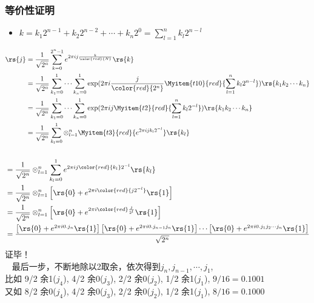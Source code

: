 \begin{frame}
    \frametitle{等价性证明}
    \begin{itemize}
        \item $k=k_1 2^{n-1}+k_2 2^{n-2}+\cdots+ k_n 2^{0} = \sum_{l=1} ^ n k_l 2^{n-l} $
      \end{itemize} 
    \[\begin{aligned} 
    \rs{j}&= \frac{1}{\sqrt{2^n}}\sum_{k=0} ^{2^n -1} e^{2\pi i j\frac{k}{\color{red}{N}}} \rs{k} \\
    &= \frac{1}{\sqrt{2^n}} \sum_{k_{1}=0} ^{1} \cdots \sum_{k_{n}=0} ^{1} \exp(2\pi i \frac{j}{\color{red}{2^n}}\Myitem{t10}{red}{\sum_{l=1} ^ n k_l 2^{n-l} }) \rs{k_1 k_2 \cdots k_n} \\
    &= \frac{1}{\sqrt{2^n}} \sum_{k_{1}=0} ^{1} \cdots \sum_{k_{n}=0} ^{1} \exp(2\pi i j \Myitem{t2}{red}{\sum_{l=1} ^ n k_l 2^{-l} }) \rs{k_1 k_2 \cdots k_n} \\
    &= \frac{1}{\sqrt{2^n}} \sum_{k_{l}=0} ^{1} \otimes_{l=1} ^n \Myitem{t3}{red}{e^{2\pi i j k_l 2^{-l} }} \rs{k_l} 
    \end{aligned}\]
\end{frame}

\begin{frame}
    \frametitle{}
    \[\begin{aligned} 
    &= \frac{1}{\sqrt{2^n}} \otimes_{l=1} ^n \sum_{k_{l}=0} ^{1} {e^{2\pi i j {\color{red}{k_l}} 2^{-l} }} \rs{k_l} \\
    &= \frac{1}{\sqrt{2^n}} \otimes_{l=1} ^n \left[\rs{0} + e^{2\pi i \color{red}{j 2^{-l}} } \rs{1}\right] \\
    &= \frac{1}{\sqrt{2^n}} \otimes_{l=1} ^n \left[\rs{0} + e^{2\pi i {\color{red}\frac{j}{2^{l}}}} \rs{1}\right] \\
    &= \frac{\left[\rs{0} + e^{2\pi i 0. j_n} \rs{1} \right] \left[\rs{0} + e^{2\pi i 0. j_{n-1} j_n} \rs{1} \right] \cdots \left[\rs{0} + e^{2\pi i 0. j_1 j_2 \cdots j_n} \rs{1} \right] } {\sqrt{2^n}}\\
    \end{aligned}\]
    证毕！\\

    \Tips~ 最后一步，不断地除以2取余，依次得到$j_n, j_{n-1}, \cdots, j_1$, \\
    比如 9/2 余1($j_4$), 4/2 余0($j_3$), 2/2 余0($j_2$), 1/2 余1($j_1$), $9/16=0.1001$  \\  
    又如 8/2 余0($j_4$), 4/2 余0($j_3$), 2/2 余0($j_2$), 1/2 余1($j_1$), $8/16=0.1000$  \\    
\end{frame}

